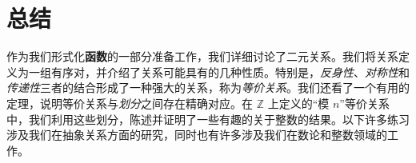 \section{总结}

作为我们形式化\textbf{函数}的一部分准备工作，我们详细讨论了二元关系。我们将关系定义为一组有序对，并介绍了关系可能具有的几种性质。特别是，\emph{反身性}、\emph{对称性}和\emph{传递性}三者的结合形成了一种强大的关系，称为\emph{等价关系}。我们还看了一个有用的定理，说明等价关系与\emph{划分}之间存在精确对应。在 $\mathbb{Z}$ 上定义的``模 $n$''等价关系中，我们利用这些划分，陈述并证明了一些有趣的关于整数的结果。以下许多练习涉及我们在抽象关系方面的研究，同时也有许多涉及我们在数论和整数领域的工作。